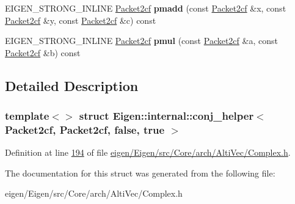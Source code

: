 \begin{DoxyCompactItemize}
E\+I\+G\+E\+N\+\_\+\+S\+T\+R\+O\+N\+G\+\_\+\+I\+N\+L\+I\+NE \hyperlink{struct_eigen_1_1internal_1_1_packet2cf}{Packet2cf} {\bfseries pmadd} (const \hyperlink{struct_eigen_1_1internal_1_1_packet2cf}{Packet2cf} \&x, const \hyperlink{struct_eigen_1_1internal_1_1_packet2cf}{Packet2cf} \&y, const \hyperlink{struct_eigen_1_1internal_1_1_packet2cf}{Packet2cf} \&c) const
\item 
\mbox{\label{struct_eigen_1_1internal_1_1conj__helper_3_01_packet2cf_00_01_packet2cf_00_01false_00_01true_01_4_a862dc97e126dc92a670828ee289031ec}} 
E\+I\+G\+E\+N\+\_\+\+S\+T\+R\+O\+N\+G\+\_\+\+I\+N\+L\+I\+NE \hyperlink{struct_eigen_1_1internal_1_1_packet2cf}{Packet2cf} {\bfseries pmul} (const \hyperlink{struct_eigen_1_1internal_1_1_packet2cf}{Packet2cf} \&a, const \hyperlink{struct_eigen_1_1internal_1_1_packet2cf}{Packet2cf} \&b) const
\end{DoxyCompactItemize}


\subsection{Detailed Description}
\subsubsection*{template$<$$>$\newline
struct Eigen\+::internal\+::conj\+\_\+helper$<$ Packet2cf, Packet2cf, false, true $>$}



Definition at line \hyperlink{eigen_2_eigen_2src_2_core_2arch_2_alti_vec_2_complex_8h_source_l00194}{194} of file \hyperlink{eigen_2_eigen_2src_2_core_2arch_2_alti_vec_2_complex_8h_source}{eigen/\+Eigen/src/\+Core/arch/\+Alti\+Vec/\+Complex.\+h}.



The documentation for this struct was generated from the following file\+:\begin{DoxyCompactItemize}
\item 
eigen/\+Eigen/src/\+Core/arch/\+Alti\+Vec/\+Complex.\+h\end{DoxyCompactItemize}
